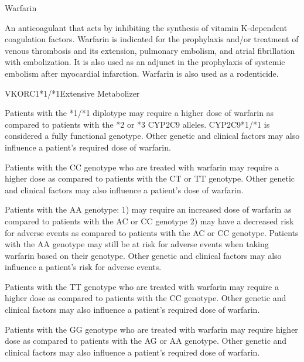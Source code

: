\documentclass{resume} %
\begin{document}


\begin{rSection}{Warfarin}
\item An anticoagulant that acts by inhibiting the synthesis of vitamin K-dependent coagulation factors. Warfarin is indicated for the prophylaxis and/or treatment of venous thrombosis and its extension, pulmonary embolism, and atrial fibrillation with embolization. It is also used as an adjunct in the prophylaxis of systemic embolism after myocardial infarction. Warfarin is also used as a rodenticide.

\begin{rSubsection}{VKORC1}{*1/*1}{Extensive Metabolizer}{}
\item Patients with the *1/*1 diplotype may require a higher dose of warfarin as compared to patients with the *2 or *3 CYP2C9 alleles. CYP2C9*1/*1 is considered a fully functional genotype. Other genetic and clinical factors may also influence a patient's required dose of warfarin.
\item Patients with the CC genotype who are treated with warfarin may require a higher dose as compared to patients with the CT or TT genotype. Other genetic and clinical factors may also influence a patient's dose of warfarin.
\item Patients with the AA genotype: 1) may require an increased dose of warfarin as compared to patients with the AC or CC genotype 2) may have a decreased risk for adverse events as compared to patients with the AC or CC genotype. Patients with the AA genotype may still be at risk for adverse events when taking warfarin based on their genotype. Other genetic and clinical factors may also influence a patient's risk for adverse events.
\item Patients with the TT genotype who are treated with warfarin may require a higher dose as compared to patients with the CC genotype. Other genetic and clinical factors may also influence a patient's required dose of warfarin.
\item Patients with the GG genotype who are treated with warfarin may require higher dose as compared to patients with the AG or AA genotype. Other genetic and clinical factors may also influence a patient's required dose of warfarin.
\end{rSubsection}


\end{rSection}

\end{document}
